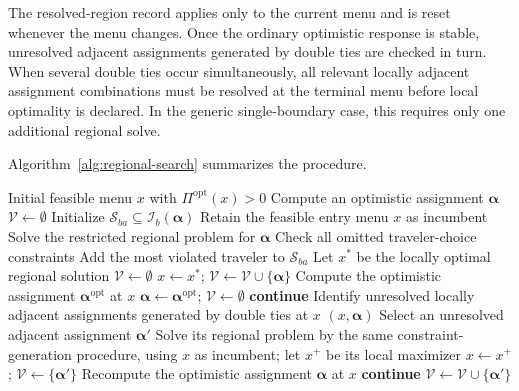 \documentclass{article}
\begin{document}
The resolved-region record applies only to the current menu and is reset
whenever the menu changes. Once the ordinary optimistic response is
stable, unresolved adjacent assignments generated by double ties are
checked in turn. When several double ties occur simultaneously, all
relevant locally adjacent assignment combinations must be resolved at
the terminal menu before local optimality is declared. In the generic
single-boundary case, this requires only one additional regional solve.

Algorithm~\ref{alg:regional-search} summarizes the procedure.

\begin{algorithm}[t]
\caption{Regional search under optimistic selection}
\label{alg:regional-search}
\begin{algorithmic}[1]
\Require Initial feasible menu $x$ with $\Pi^{\mathrm{opt}}(x)>0$
\State Compute an optimistic assignment $\bm\alpha$
\State $\mathcal V\gets\emptyset$ 
        \State Initialize $\mathcal S_{ba}\subseteq\mathcal I_b(\bm\alpha)$
        \State Retain the feasible entry menu $x$ as incumbent
        \Repeat
            \State Solve the restricted regional problem for $\bm\alpha$
            \State Check all omitted traveler-choice constraints
                \State Add the most violated traveler to $\mathcal S_{ba}$
            \EndFor
        \State Let $x^*$ be the locally optimal regional solution
            \State $\mathcal V\gets\emptyset$
        \EndIf
        \State $x\gets x^*$; $\mathcal V\gets\mathcal V\cup\{\bm\alpha\}$
    \EndIf
    \State Compute the optimistic assignment $\bm\alpha^{\mathrm{opt}}$ at $x$
        \State $\bm\alpha\gets\bm\alpha^{\mathrm{opt}}$;
        $\mathcal V\gets\emptyset$
        \State \textbf{continue}
    \EndIf
    \State Identify unresolved locally adjacent assignments generated by
    double ties at $x$
        \State \Return $(x,\bm\alpha)$
    \EndIf
    \State Select an unresolved adjacent assignment $\bm\alpha'$
    \State Solve its regional problem by the same constraint-generation
    procedure, using $x$ as incumbent; let $x^+$ be its local maximizer
        \State $x\gets x^+$; $\mathcal V\gets\{\bm\alpha'\}$
        \State Recompute the optimistic assignment $\bm\alpha$ at $x$
        \State \textbf{continue}
    \Else
        \State $\mathcal V\gets\mathcal V\cup\{\bm\alpha'\}$
    \EndIf
\EndWhile
\end{algorithmic}
\end{algorithm}
\end{document}
